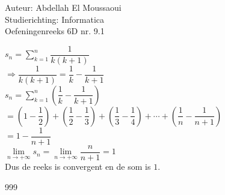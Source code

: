 \documentclass[a4paper]{article}
\begin{document}
  
\noindent \large Auteur: Abdellah El Moussaoui \\
\noindent \large Studierichting: Informatica\\
\noindent \large Oefeningenreeks 6D nr. 9.1\\

\medskip

\normalsize

$s_n = \displaystyle\sum_{k=1}^{n} \dfrac{1}{k\left(k+1\right)}$\\


$\Rightarrow \dfrac{1}{k\left(k+1\right)} = \dfrac{1}{k}-\dfrac{1}{k+1}$ \\

$s_n = \displaystyle\sum_{k=1}^{n}\left(\dfrac{1}{k}-\dfrac{1}{k+1}\right)$\\

$= \left(1-\dfrac{1}{2}\right) + \left(\dfrac{1}{2} - \dfrac{1}{3}\right) + \left(\dfrac{1}{3} - \dfrac{1}{4}\right)+\cdots+\left(\dfrac{1}{n} - \dfrac{1}{n+1}\right)$\\

$= 1-\dfrac{1}{n+1}$ \\

$\lim\limits_{n\to+\infty} s_n=\lim\limits_{n\to+\infty}\dfrac{n}{n+1} = 1$ \\

Dus de reeks is convergent en de som is $1$.\\


\begin{thebibliography}{999}
\end{thebibliography}
\end{document}

